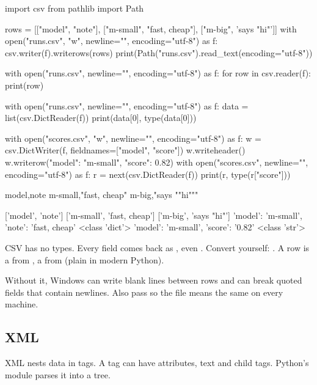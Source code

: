 \begin{pycode}
import csv
from pathlib import Path

rows = [["model", "note"], ["m-small", "fast, cheap"], ["m-big", 'says "hi"']]
with open("runs.csv", "w", newline="", encoding="utf-8") as f:
    csv.writer(f).writerows(rows)
print(Path("runs.csv").read_text(encoding="utf-8"))

with open("runs.csv", newline="", encoding="utf-8") as f:
    for row in csv.reader(f):
        print(row)

with open("runs.csv", newline="", encoding="utf-8") as f:
    data = list(csv.DictReader(f))
print(data[0], type(data[0]))

with open("scores.csv", "w", newline="", encoding="utf-8") as f:
    w = csv.DictWriter(f, fieldnames=["model", "score"])
    w.writeheader()
    w.writerow({"model": "m-small", "score": 0.82})
with open("scores.csv", newline="", encoding="utf-8") as f:
    r = next(csv.DictReader(f))
print(r, type(r["score"]))
\end{pycode}
\begin{rawcode}
model,note
m-small,"fast, cheap"
m-big,"says ""hi"""

['model', 'note']
['m-small', 'fast, cheap']
['m-big', 'says "hi"']
{'model': 'm-small', 'note': 'fast, cheap'} <class 'dict'>
{'model': 'm-small', 'score': '0.82'} <class 'str'>
\end{rawcode}

\begin{typecheck}
CSV has no types. Every field comes back as , even . Convert yourself:
. A row is a  from , a 
from  (plain  in modern Python).
\end{typecheck}

\begin{trap}[: open CSV files with \code{newline=""}]
Without it, Windows can write blank lines between rows and can break quoted fields that
contain newlines. Also pass  so the file means the same on every
machine.
\end{trap}

\subsection{XML}

XML nests data in tags. A tag can have attributes, text and child tags. Python's
 module parses it into a tree.

